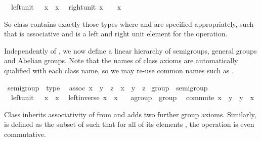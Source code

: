 \begin{isabellebody}
\ \ left{\isacharunderscore}unit{\isacharcolon}\ {\isachardoublequote}{\isasymunit}\ {\isasymodot}\ x\ {\isacharequal}\ x{\isachardoublequote}\isanewline
\ \ right{\isacharunderscore}unit{\isacharcolon}\ {\isachardoublequote}x\ {\isasymodot}\ {\isasymunit}\ {\isacharequal}\ x{\isachardoublequote}\isamarkupfalse%
%
\begin{isamarkuptext}%
\noindent So class  contains exactly those types
  \isa{{\isasymtau}} where \isa{{\isasymodot}\ {\isasymColon}\ {\isasymtau}\ {\isasymRightarrow}\ {\isasymtau}\ {\isasymRightarrow}\ {\isasymtau}} and \isa{{\isasymunit}\ {\isasymColon}\ {\isasymtau}}
  are specified appropriately, such that \isa{{\isasymodot}} is associative and
  \isa{{\isasymunit}} is a left and right unit element for the \isa{{\isasymodot}}
  operation.%
\end{isamarkuptext}%
\isamarkuptrue%
%
\begin{isamarkuptext}%
\medskip Independently of , we now define a linear
  hierarchy of semigroups, general groups and Abelian groups.  Note
  that the names of class axioms are automatically qualified with each
  class name, so we may re-use common names such as .%
\end{isamarkuptext}%
\isamarkuptrue%
\ semigroup\ {\isasymsubseteq}\ type\isanewline
\ \ assoc{\isacharcolon}\ {\isachardoublequote}{\isacharparenleft}x\ {\isasymodot}\ y{\isacharparenright}\ {\isasymodot}\ z\ {\isacharequal}\ x\ {\isasymodot}\ {\isacharparenleft}y\ {\isasymodot}\ z{\isacharparenright}{\isachardoublequote}\isanewline
\isanewline
\isamarkupfalse%
\ group\ {\isasymsubseteq}\ semigroup\isanewline
\ \ left{\isacharunderscore}unit{\isacharcolon}\ {\isachardoublequote}{\isasymunit}\ {\isasymodot}\ x\ {\isacharequal}\ x{\isachardoublequote}\isanewline
\ \ left{\isacharunderscore}inverse{\isacharcolon}\ {\isachardoublequote}x{\isasyminv}\ {\isasymodot}\ x\ {\isacharequal}\ {\isasymunit}{\isachardoublequote}\isanewline
\isanewline
\isamarkupfalse%
\ agroup\ {\isasymsubseteq}\ group\isanewline
\ \ commute{\isacharcolon}\ {\isachardoublequote}x\ {\isasymodot}\ y\ {\isacharequal}\ y\ {\isasymodot}\ x{\isachardoublequote}\isamarkupfalse%
%
\begin{isamarkuptext}%
\noindent Class  inherits associativity of \isa{{\isasymodot}}
  from  and adds two further group axioms. Similarly,
   is defined as the subset of  such that
  for all of its elements \isa{{\isasymtau}}, the operation \isa{{\isasymodot}\ {\isasymColon}\ {\isasymtau}\ {\isasymRightarrow}\ {\isasymtau}\ {\isasymRightarrow}\ {\isasymtau}} is even commutative.%

\end{isamarkuptext}
\end{isabellebody}
